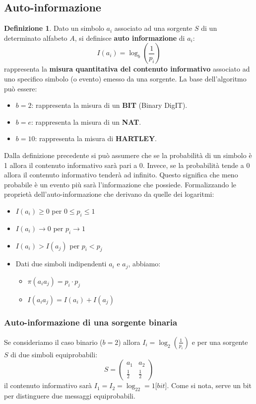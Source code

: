 \documentclass{article}
\theoremstyle{definition}
\newtheorem{definizione}{Definizione}[section]
\numberwithin{equation}{section}
\begin{document}
\subsection{Auto-informazione}
\begin{definizione}
    Dato un simbolo $a_i$ associato ad una sorgente $S$ di un determinato alfabeto $A$, si definisce \textbf{auto informazione} di $a_i$:
    \begin{equation}
        I(a_i)=\log_b\left(\frac{1}{p_i}\right)
    \end{equation}
    rappresenta la \textbf{misura quantitativa del contenuto informativo} associato ad uno specifico simbolo (o evento) emesso da una sorgente. La base dell'algoritmo può essere:
    \begin{itemize}
        \item $b = 2$: rappresenta la misura di un \textbf{BIT} (Binary DigIT).
        \item $b=e$: rappresenta la misura di un \textbf{NAT}.
        \item $b=10$: rappresenta la misura di \textbf{HARTLEY}.
    \end{itemize}
\end{definizione}
Dalla definizione precedente si può assumere che se la probabilità di un simbolo è 1 allora il contenuto informativo sarà pari a 0. Invece, se la probabilità tende a 0 allora il contenuto informativo tenderà ad infinito. Questo significa che meno probabile è un evento più sarà l'informazione che possiede. Formalizzando le proprietà dell'auto-informazione che derivano da quelle dei logaritmi:
\begin{itemize}
    \item $I(a_i)\geq0$ per $0\leq p_i \leq 1$
    \item $I(a_i) \xrightarrow{}0$ per $p_i \xrightarrow{} 1$
    \item $I(a_i) > I(a_j)$ per $p_i < p_j$
    \item Dati due simboli indipendenti $a_i$ e $a_j$, abbiamo:
          \begin{itemize}
              \item $\pi (a_ia_j)=p_i\cdot p_j$
              \item $I(a_ia_j)=I(a_i)+I(a_j)$
          \end{itemize}
\end{itemize}
\subsubsection{Auto-informazione di una sorgente binaria}
Se consideriamo il caso binario ($b=2$) allora $I_i=\log_2(\frac{1}{p_i})$ e per una sorgente $S$ di due simboli equiprobabili:
\begin{equation*}
    S=\begin{pmatrix}
        a_1         & a_2         \\
        \frac{1}{2} & \frac{1}{2}
    \end{pmatrix}
\end{equation*}
il contenuto informativo sarà $I_1=I_2=\log_22=1 [bit$]. Come si nota, serve un bit per distinguere due messaggi equiprobabili.
\end{document}
